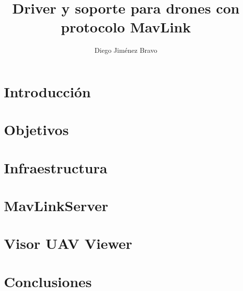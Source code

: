 \documentclass{new_cit_thesis}
\begin{document}
\title{Driver y soporte para drones con protocolo MavLink}
\author{Diego Jiménez Bravo}
\address{Tutor: Jose Maria Cañas Plaza} 
\copyyear{\the\year}                               
\pubnum{}                                          
\dedication{}  		   


\maketitle
\cleardoublepage


\cleardoublepage


\cleardoublepage


\cleardoublepage


\cleardoublepage
\pagestyle{plain}
\chapter{Introducción}


\cleardoublepage
\chapter{Objetivos}


\cleardoublepage
\chapter{Infraestructura}


\cleardoublepage
\chapter{MavLinkServer}


\cleardoublepage
\chapter{Visor UAV Viewer}


\cleardoublepage
\chapter{Conclusiones}


\cleardoublepage

\end{document}
